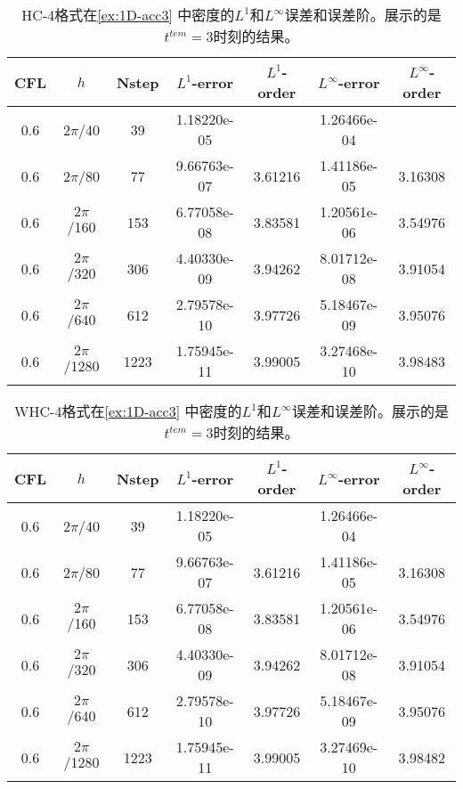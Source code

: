 \def\titleintable{CFL&$h$&Nstep&$L^1$-error&$L^1$-order&$L^\infty$-error&$L^\infty$-order\\}
\begin{table}[htbp]
	\caption{HC-4格式在\cref{ex:1D-acc3} 中密度的$L^1$和$L^\infty$误差和误差阶。展示的是$t^{tem} = 3$时刻的结果。}
	\label{ta:1D-ex3-HC4}
	\centering
	\begin{tabular}{ccccccc}
		\toprule
		\titleintable
		\midrule
		0.6 & $2\pi$/40   & 39   & 1.18220e-05 &         & 1.26466e-04 &         \\
		0.6 & $2\pi$/80   & 77   & 9.66763e-07 & 3.61216 & 1.41186e-05 & 3.16308 \\
		0.6 & $2\pi$/160  & 153  & 6.77058e-08 & 3.83581 & 1.20561e-06 & 3.54976 \\
		0.6 & $2\pi$/320  & 306  & 4.40330e-09 & 3.94262 & 8.01712e-08 & 3.91054 \\
		0.6 & $2\pi$/640  & 612  & 2.79578e-10 & 3.97726 & 5.18467e-09 & 3.95076 \\
		0.6 & $2\pi$/1280 & 1223 & 1.75945e-11 & 3.99005 & 3.27468e-10 & 3.98483 \\
		\bottomrule
	\end{tabular}
\end{table}

\begin{table}[htbp]
	\caption{WHC-4格式在\cref{ex:1D-acc3} 中密度的$L^1$和$L^\infty$误差和误差阶。展示的是$t^{tem} = 3$时刻的结果。}
	\label{ta:1D-ex3-WHC4}
	\centering
	\begin{tabular}{ccccccc}
		\toprule
		\titleintable
		\midrule
		0.6 & $2\pi$/40   & 39   & 1.18220e-05 &         & 1.26466e-04 &         \\
		0.6 & $2\pi$/80   & 77   & 9.66763e-07 & 3.61216 & 1.41186e-05 & 3.16308 \\
		0.6 & $2\pi$/160  & 153  & 6.77058e-08 & 3.83581 & 1.20561e-06 & 3.54976 \\
		0.6 & $2\pi$/320  & 306  & 4.40330e-09 & 3.94262 & 8.01712e-08 & 3.91054 \\
		0.6 & $2\pi$/640  & 612  & 2.79578e-10 & 3.97726 & 5.18467e-09 & 3.95076 \\
		0.6 & $2\pi$/1280 & 1223 & 1.75945e-11 & 3.99005 & 3.27469e-10 & 3.98482 \\
		\bottomrule
	\end{tabular}
\end{table}

